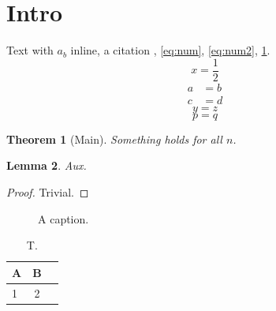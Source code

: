 \documentclass{article}
\newtheorem{theorem}{Theorem}[section]
\newtheorem{lemma}[theorem]{Lemma}
\begin{document}
\section{Intro}
Text with \(a_b\) inline, a citation \cite{Ref1}, \ref{eq:num}, \eqref{eq:num2}, \ref{thm:m}.
\begin{equation}\label{eq:num}
  x = \frac{1}{2}
\end{equation}
\begin{align}\label{eq:num2}
  a &= b \\
  c &= d
\end{align}
\[
  y = z \tag{star}
\]
\begin{equation*}
  p = q
\end{equation*}
\begin{theorem}[Main]\label{thm:m}
  Something holds for all $n$.
\end{theorem}
\begin{lemma}\label{lem:l}
  Aux.
\end{lemma}
\begin{proof}
  Trivial.
\end{proof}
\begin{figure}
  \centering
  \caption{A caption. \label{fig:f}}
\end{figure}
\begin{table}
  \caption{T. \label{tab:t}}
  \begin{tabular}{lcr}
    \hline
    A & B \\ \hline
    1 & 2 \\
    \hline
  \end{tabular}
\end{table}
\end{document}
